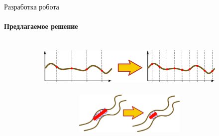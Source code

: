 \documentclass[aspectratio=169,xcolor=table]{beamer}
\begin{document}
\begin{frame}[t]{Разработка робота}
    \framesubtitle{Предлагаемое решение}
    \begin{columns}[T,onlytextwidth]
        \begin{column}{0.48\textwidth}
            \vspace{-0.8cm}
            \begin{figure}[H]
                \begin{subfigure}{0.99\textwidth}
                    \centering\includegraphics[height=2cm,width=1\textwidth,keepaspectratio]{../images/f1.png}
                    \label{fig:../images/f1.png}
                \end{subfigure}

                \begin{subfigure}{0.99\textwidth}
                    \centering\includegraphics[height=2cm,width=1\textwidth,keepaspectratio]{../images/f2.png}
                    \label{fig:../images/f2.png}
                \end{subfigure}


\end{figure}
\end{column}
\end{columns}
\end{frame}
\end{document}
